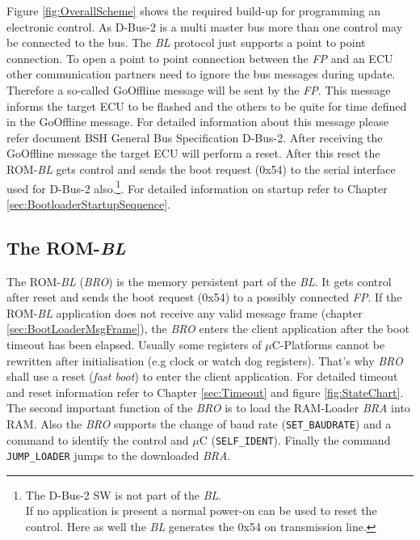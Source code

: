 \documentclass[a4paper,british,oneside,12pt]{scrartcl}
\newcommand{\bl}{\emph{BL}}
\newcommand{\fp}{\emph{FP}}
\newcommand{\bra}{\emph{BRA}}
\newcommand{\bro}{\emph{BRO}}
\newcommand{\uc}{$\mu$C}
\begin{document}
Figure \ref{fig:OverallScheme} shows the required build-up for programming an electronic control. As D-Bus-2 is a multi master bus more than one control may be connected to the bus. The \bl{} protocol just supports a point to point connection. 
To open a point to point connection between the \fp{} and an ECU other communication partners need to ignore the bus messages during update. Therefore a so-called GoOffline message will be sent by the \fp{}.
This message informs the target ECU to be flashed and the others to be quite for time defined in the GoOffline message. For detailed information about this message please refer document \flqq{}BSH General Bus Specification D-Bus-2\frqq{}.
After receiving the GoOffline message the target ECU will perform a reset. After this reset the ROM-\bl{} gets control and sends the boot request (0x54) to the serial interface used for D-Bus-2 also.\footnote{The D-Bus-2 SW is not part of the \bl{}.\\
If no application is present a normal power-on can be used to reset the control. Here as well the \bl{} generates the 0x54 on transmission line.}. For detailed information on startup refer to Chapter \ref{sec:BootloaderStartupSequence}.\\


\subsection{The ROM-\bl}
\label{sec:TheROMBl}
The ROM-\bl{} (\bro{}) is the memory persistent part of the \bl{}. It gets control after reset and sends the boot request (0x54) to a possibly connected \fp{}. If the ROM-\bl{} application does not receive any valid message frame (chapter \ref{sec:BootLoaderMsgFrame}), the \bro{} enters the client application after the boot timeout has been elapsed. Usually some registers of \uc{}-Platforms cannot be rewritten after initialisation (e.g clock or watch dog registers). That's why \bro{} shall use a reset (\emph{fast boot}) to enter the client application. For detailed timeout and reset information refer to Chapter \ref{sec:Timeout} and figure \ref{fig:StateChart}.\\
The second important function of the \bro{} is to load the RAM-Loader \bra{} into RAM. Also the \bro{} supports the change of baud rate (\texttt{SET_BAUDRATE}) and a command to identify the control and \uc{} (\texttt{SELF_IDENT}). Finally the command \texttt{JUMP_LOADER} jumps to the downloaded \bra{}.
\end{document}
